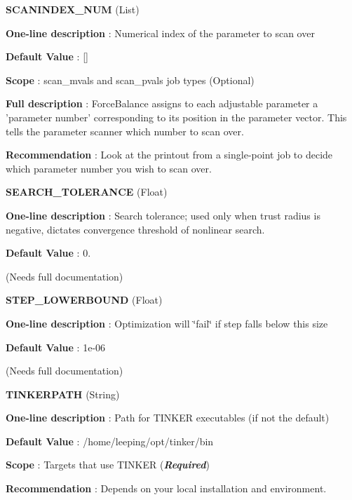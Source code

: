 \begin{DoxyItemize}
\item {\bfseries  S\-C\-A\-N\-I\-N\-D\-E\-X\-\_\-\-N\-U\-M } (List) \par
{\bfseries  One-\/line description }\-: Numerical index of the parameter to scan over \par
{\bfseries  Default Value }\-: \mbox{[}\mbox{]} \par
{\bfseries  Scope }\-: scan\-\_\-mvals and scan\-\_\-pvals job types (Optional) \par
{\bfseries  Full description }\-: Force\-Balance assigns to each adjustable parameter a 'parameter number' corresponding to its position in the parameter vector. This tells the parameter scanner which number to scan over. \par
{\bfseries  Recommendation }\-: Look at the printout from a single-\/point job to decide which parameter number you wish to scan over.\end{DoxyItemize}
\begin{DoxyItemize}
\item {\bfseries  S\-E\-A\-R\-C\-H\-\_\-\-T\-O\-L\-E\-R\-A\-N\-C\-E } (Float) \par
{\bfseries  One-\/line description }\-: Search tolerance; used only when trust radius is negative, dictates convergence threshold of nonlinear search. \par
{\bfseries  Default Value }\-: 0. \par
(Needs full documentation)\end{DoxyItemize}
\begin{DoxyItemize}
\item {\bfseries  S\-T\-E\-P\-\_\-\-L\-O\-W\-E\-R\-B\-O\-U\-N\-D } (Float) \par
{\bfseries  One-\/line description }\-: Optimization will \char`\"{}fail\char`\"{} if step falls below this size \par
{\bfseries  Default Value }\-: 1e-\/06 \par
(Needs full documentation)\end{DoxyItemize}
\begin{DoxyItemize}
\item {\bfseries  T\-I\-N\-K\-E\-R\-P\-A\-T\-H } (String) \par
{\bfseries  One-\/line description }\-: Path for T\-I\-N\-K\-E\-R executables (if not the default) \par
{\bfseries  Default Value }\-: /home/leeping/opt/tinker/bin \par
{\bfseries  Scope }\-: Targets that use T\-I\-N\-K\-E\-R ({\bfseries {\itshape Required}}) \par
{\bfseries  Recommendation }\-: Depends on your local installation and environment.\end{DoxyItemize}

